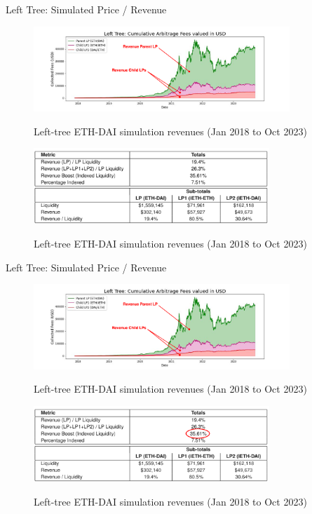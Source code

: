 \documentclass[10pt,xcolor=svgnames]{beamer} %
\begin{document}
\begin{frame}{Left Tree: Simulated Price / Revenue}

\begin{figure}[h!]
\includegraphics[width=3.8in]{img/arbitrage2.png}
\label{fig:simulation}
\caption{Left-tree ETH-DAI simulation revenues (Jan 2018 to Oct 2023)}
\end{figure}


\begin{figure}[h!]
\includegraphics[width=3.5in]{img/sim_revenues.png}
\label{fig:simulation}
\caption{Left-tree ETH-DAI simulation revenues (Jan 2018 to Oct 2023)}
\end{figure}

\end{frame}

\begin{frame}{Left Tree: Simulated Price / Revenue}

\begin{figure}[h!]
\includegraphics[width=3.8in]{img/arbitrage2.png}
\label{fig:simulation}
\caption{Left-tree ETH-DAI simulation revenues (Jan 2018 to Oct 2023)}
\end{figure}

\begin{figure}[h!]
\includegraphics[width=3.5in]{img/sim_revenues1.png}
\label{fig:simulation}
\caption{Left-tree ETH-DAI simulation revenues (Jan 2018 to Oct 2023)}
\end{figure}

\end{frame}
\end{document}
